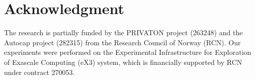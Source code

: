 \documentclass[journal]{IEEEtran}
\begin{document}
 \section*{Acknowledgment}
The research is partially funded by the PRIVATON project (263248) and the Autocap project (282315) from the Research Council of Norway (RCN). Our experiments were performed on the Experimental Infrastructure for Exploration of Exascale Computing (eX3) system, which is financially supported by RCN under contract 270053.


 

\ifCLASSOPTIONcaptionsoff
  \newpage
\fi
\vfill
\end{document}
